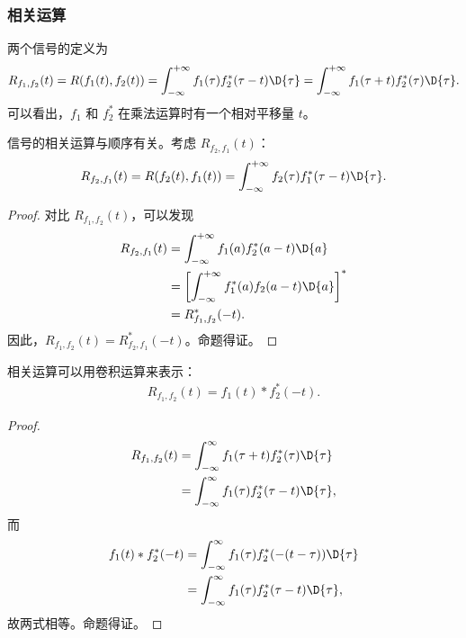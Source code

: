 \subsubsection{相关运算}

\begin{definition}
    两个信号的定义为
    \begin{align*}
        R_{f_1, f_2}(t)
        = R(f_1(t), f_2(t))
        = \int_{-\infty}^{+\infty}f_1(\tau)f_2^*(\tau - t)\D{\tau}
        = \int_{-\infty}^{+\infty}f_1(\tau + t)f_2^*(\tau)\D{\tau}.
    \end{align*}
    可以看出，$f_1$ 和 $f_2^*$ 在乘法运算时有一个相对平移量 $t$。
\end{definition}

\begin{property}
    信号的相关运算与顺序有关。考虑 $R_{f_2, f_1}(t)$：
    \begin{align*}
        R_{f_2, f_1}(t) = R(f_2(t), f_1(t)) = \int_{-\infty}^{+\infty}f_2(\tau)f_1^*(\tau - t)\D{\tau}.
    \end{align*}
\end{property}

\begin{proof}
    对比 $R_{f_1, f_2}(t)$，可以发现
    \begin{align*}
        R_{f_2, f_1}(t) & = \int_{-\infty}^{+\infty}f_1(a)f_2^*(a - t)\D{a} \\
        & = \left[\int_{-\infty}^{+\infty}f_1^*(a)f_2(a - t)\D{a}\right]^* \\
        & = R_{f_1, f_2}^*(-t).
    \end{align*}
    因此，$R_{f_1, f_2}(t) = R_{f_2, f_1}^*(-t)$。命题得证。
\end{proof}

\begin{property}[相关运算与卷积运算的关系]
    相关运算可以用卷积运算来表示：
    \begin{align*}
        R_{f_1, f_2}(t) = f_1(t) * f_2^*(-t).
    \end{align*}
\end{property}

\begin{proof}
    \begin{align*}
        R_{f_1,f_2}(t) & = \int_{-\infty}^\infty f_1(\tau + t)f_2^*(\tau)\D{\tau} \\
        & = \int_{-\infty}^\infty f_1(\tau)f_2^*(\tau-t)\D{\tau},
    \end{align*}
    而
    \begin{align*}
        f_1(t)*f_2^*(-t) & = \int_{-\infty}^{\infty}f_1(\tau)f_2^*(-(t - \tau))\D{\tau} \\
        & = \int_{-\infty}^{\infty}f_1(\tau)f_2^*(\tau - t)\D{\tau},
    \end{align*}
    故两式相等。命题得证。
\end{proof}

